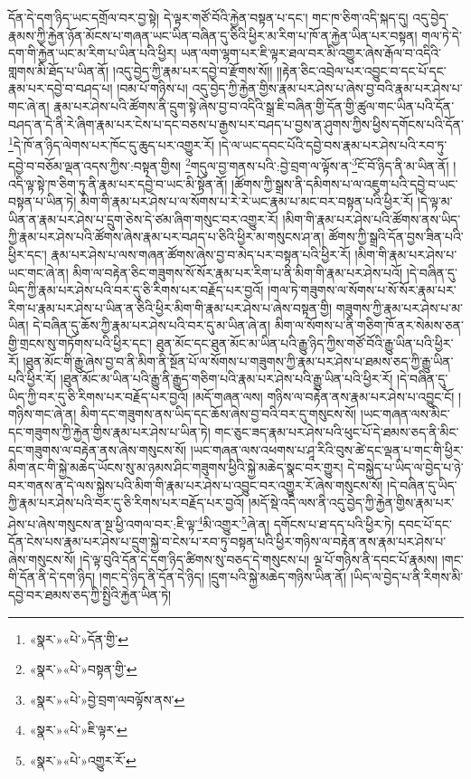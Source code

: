 དོན་དེ་དག་ཉིད་ཡང་དགྲོལ་བར་བྱ་སྟེ། དེ་ལྟར་གཙོ་བོའི་རྐྱེན་བསྟན་པ་དང་། གང་ཁ་ཅིག་འདི་སྐད་དུ། འདུ་བྱེད་རྣམས་ཀྱི་རྐྱེན་ཉོན་མོངས་པ་གཞན་ཡང་ཡིན་བཞིན་དུ་ཅིའི་ཕྱིར་མ་རིག་པ་ཁོ་ན་རྐྱེན་ཡིན་པར་བསྟན། གལ་ཏེ་དེ་དག་གི་རྐྱེན་ཡང་མ་རིག་པ་ཡིན་པའི་ཕྱིར། ཡན་ལག་ལྷག་པར་ཇི་ལྟར་ཐལ་བར་མི་འགྱུར་ཞེས་རྒོལ་བ་འདིའི་གླགས་མི་ཐོད་པ་ཡིན་ནོ། །འདུ་བྱེད་ཀྱི་རྣམ་པར་དབྱེ་བ་རྫོགས་སོ།། །།རྟེན་ཅིང་འབྲེལ་པར་འབྱུང་བ་དང་པོ་དང་རྣམ་པར་དབྱེ་བ་བཤད་པ། །བམ་པོ་གཉིས་པ། འདུ་བྱེད་ཀྱི་རྐྱེན་གྱིས་རྣམ་པར་ཤེས་པ་ཞེས་བྱ་བའི་རྣམ་པར་ཤེས་པ་གང་ཞེ་ན། རྣམ་པར་ཤེས་པའི་ཚོགས་ནི་དྲུག་སྟེ་ཞེས་བྱ་བ་འདིའི་སྒྲ་ཇི་བཞིན་གྱི་དོན་གྱི་ཚུལ་གང་ཡིན་པའི་དོན་བཤད་ན་དེ་ནི་རེ་ཞིག་རྣམ་པར་ངེས་པ་དང་བཅས་པ་རྒྱས་པར་བཤད་པ་བྱས་ན་ཤུགས་ཀྱིས་ཕྱིས་དགོངས་པའི་དོན་\footnote{«སྣར་»«པེ་»དོན་གྱི་}དེ་ཁོ་ན་ཉིད་ལེགས་པར་ཁོང་དུ་ཆུད་པར་འགྱུར་རོ། །དེ་ལ་ཡང་དབང་པོའི་དབྱེ་བས་རྣམ་པར་ཤེས་པའི་རབ་ཏུ་དབྱེ་བ་བཅོམ་ལྡན་འདས་ཀྱིས་:བསྟན་གྱིས། \footnote{«སྣར་»«པེ་»བསྟན་གྱི་}གདུལ་བྱ་གནས་པའི་:བྱེ་བྲག་ལ་ལྟོས་ན་\footnote{«སྣར་»«པེ་»བྱེ་བྲག་ལབལྟོས་ནས་}ངོ་བོ་ཉིད་ནི་མ་ཡིན་ནོ། །འདི་ལྟ་སྟེ་ཁ་ཅིག་ཏུ་ནི་རྣམ་པར་དབྱེ་བ་ཡང་མི་སྟོན་ནོ། །ཚོགས་ཀྱི་སྒྲས་ནི་དམིགས་པ་ལ་འཇུག་པའི་དབྱེ་བ་ཡང་བསྟན་པ་ཡིན་ཏེ། མིག་གི་རྣམ་པར་ཤེས་པ་ལ་སོགས་པ་རེ་རེ་ཡང་རྣམ་པ་མང་བར་བསྟན་པའི་ཕྱིར་རོ། །དེ་ལྟ་མ་ཡིན་ན་རྣམ་པར་ཤེས་པ་དྲུག་ཅེས་དེ་ཙམ་ཞིག་གསུང་བར་འགྱུར་རོ། །མིག་གི་རྣམ་པར་ཤེས་པའི་ཚོགས་ནས་ཡིད་ཀྱི་རྣམ་པར་ཤེས་པའི་ཚོགས་ཞེས་རྣམ་པར་བཤད་པ་ཅིའི་ཕྱིར་མ་གསུངས་ཤ་ན། ཚོགས་ཀྱི་སྒྲའི་དོན་བྱས་ཟིན་པའི་ཕྱིར་དང་། རྣམ་པར་ཤེས་པ་ལས་གཞན་ཚོགས་ཞེས་བྱ་བ་མེད་པར་བསྟན་པའི་ཕྱིར་རོ། །མིག་གི་རྣམ་པར་ཤེས་པ་ཡང་གང་ཞེ་ན། མིག་ལ་བརྟེན་ཅིང་གཟུགས་སོ་སོར་རྣམ་པར་རིག་པ་ནི་མིག་གི་རྣམ་པར་ཤེས་པའོ། །དེ་བཞིན་དུ་ཡིད་ཀྱི་རྣམ་པར་ཤེས་པའི་བར་དུ་ཅི་རིགས་པར་བརྗོད་པར་བྱའོ། །གལ་ཏེ་གཟུགས་ལ་སོགས་པ་སོ་སོར་རྣམ་པར་རིག་པ་རྣམ་པར་ཤེས་པ་ཡིན་ན་ཅིའི་ཕྱིར་མིག་གི་རྣམ་པར་ཤེས་པ་ཞེས་བསྟན་གྱི། གཟུགས་ཀྱི་རྣམ་པར་ཤེས་པ་མ་ཡིན། དེ་བཞིན་དུ་ཆོས་ཀྱི་རྣམ་པར་ཤེས་པའི་བར་དུ་མ་ཡིན་ཞེ་ན། མིག་ལ་སོགས་པ་ནི་གཅིག་ཁོ་ནར་སེམས་ཅན་གྱི་གྲངས་སུ་གཏོགས་པའི་ཕྱིར་དང་། ཐུན་མོང་དང་ཐུན་མོང་མ་ཡིན་པའི་རྒྱུ་ཉིད་ཀྱིས་གཙོ་བོའི་རྒྱུ་ཡིན་པའི་ཕྱིར་རོ། །ཐུན་མོང་གི་རྒྱུ་ཞེས་བྱ་བ་ནི་མིག་ནི་སྔོན་པོ་ལ་སོགས་པ་གཟུགས་ཀྱི་རྣམ་པར་ཤེས་པ་ཐམས་ཅད་ཀྱི་རྒྱུ་ཡིན་པའི་ཕྱིར་རོ། །ཐུན་མོང་མ་ཡིན་པའི་རྒྱུ་ནི་རྒྱུད་གཅིག་པའི་རྣམ་པར་ཤེས་པའི་རྒྱུ་ཡིན་པའི་ཕྱིར་རོ། །དེ་བཞིན་དུ་ཡིད་ཀྱི་བར་དུ་ཅི་རིགས་པར་བརྗོད་པར་བྱའོ། །མདོ་གཞན་ལས། གཉིས་ལ་བརྟེན་ནས་རྣམ་པར་ཤེས་པ་འབྱུང་ངོ། །གཉིས་གང་ཞེ་ན། མིག་དང་གཟུགས་ནས་ཡིད་དང་ཆོས་ཞེས་བྱ་བའི་བར་དུ་གསུངས་སོ། །ཡང་གཞན་ལས་མིང་དང་གཟུགས་ཀྱི་རྐྱེན་གྱིས་རྣམ་པར་ཤེས་པ་ཡིན་ཏེ། གང་ཅུང་ཟད་རྣམ་པར་ཤེས་པའི་ཕུང་པོ་དེ་ཐམས་ཅད་ནི་མིང་དང་གཟུགས་ལ་བརྟེན་ནས་ཞེས་གསུངས་སོ། །ཡང་གཞན་ལས་འཕགས་པ་ཤཱ་རིའི་བུས་ཚེ་དང་ལྡན་པ་གང་གི་ཕྱིར་མིག་ནང་གི་སྐྱེ་མཆེད་ཡོངས་སུ་མ་ཉམས་ཤིང་གཟུགས་ཕྱིའི་སྐྱེ་མཆེད་སྣང་བར་གྱུར། དེ་བསྐྱེད་པ་ཡིད་ལ་བྱེད་པ་ཉེ་བར་གནས་ན་དེ་ལས་སྐྱེས་པའི་མིག་གི་རྣམ་པར་ཤེས་པ་འབྱུང་བར་འགྱུར་རོ་ཞེས་གསུངས་སོ། །དེ་བཞིན་དུ་ཡིད་ཀྱི་རྣམ་པར་ཤེས་པའི་བར་དུ་ཅི་རིགས་པར་བརྗོད་པར་བྱའོ། །མདོ་སྡེ་འདི་ལས་ནི་འདུ་བྱེད་ཀྱི་རྐྱེན་གྱིས་རྣམ་པར་ཤེས་པ་ཞེས་གསུངས་ན་སྔ་ཕྱི་འགལ་བར་:ཇི་ལྟ་\footnote{«སྣར་»«པེ་»ཇི་ལྟར་}མི་འགྱུར་\footnote{«སྣར་»«པེ་»འགྱུར་རོ་}ཞེ་ན། དགོངས་པ་ཐ་དད་པའི་ཕྱིར་ཏེ། དབང་པོ་དང་དོན་ངེས་པས་རྣམ་པར་ཤེས་པ་དྲུག་སྐྱེ་བ་ངེས་པ་རབ་ཏུ་བསྟན་པའི་ཕྱིར་གཉིས་ལ་བརྟེན་ནས་རྣམ་པར་ཤེས་པ་ཞེས་གསུངས་སོ། །དེ་ལྟ་བུའི་དོན་དེ་དག་ཉིད་ཚིགས་སུ་བཅད་དེ་གསུངས་པ། ལྔ་པོ་གཉིས་ནི་དབང་པོ་རྣམས། །གང་གི་དོན་ནི་དེ་དག་ཉིད། །གང་དེ་ཉིད་ནི་དོན་དེ་ཉིད། །དྲུག་པའི་སྐྱེ་མཆེད་གཉིས་ཡིན་ནོ། །ཡིད་ལ་བྱེད་པ་ནི་རིགས་མི་དབྱེ་བར་ཐམས་ཅད་ཀྱི་སྤྱིའི་རྐྱེན་ཡིན་ཏེ། 